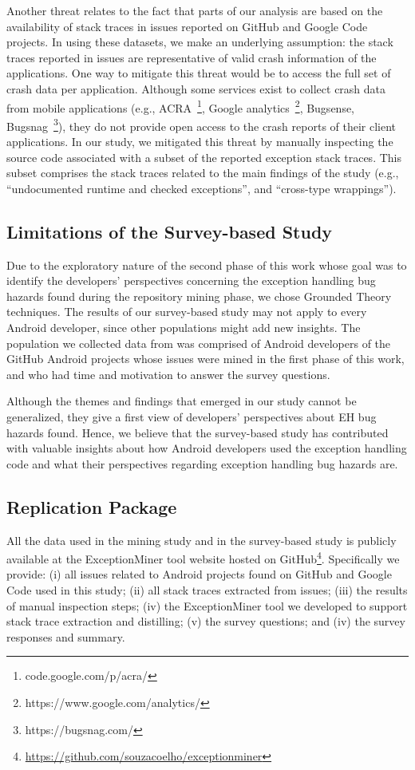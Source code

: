 Another threat relates to the fact that parts of our analysis
are based on the availability of stack traces in issues reported on GitHub and Google Code projects.
In using these datasets, we make an underlying assumption: the stack traces reported in issues are
representative of valid crash information of the applications.
One way to mitigate this threat would be to access the full
set of crash data per application. Although some services exist
to collect crash data from mobile applications (e.g., ACRA~\footnote{code.google.com/p/acra/},  Google analytics~\footnote{https://www.google.com/analytics/}, Bugsense, Bugsnag~\footnote{https://bugsnag.com/}),
they do not provide open access to the crash reports of their client applications.
In our study, we mitigated this threat by manually inspecting
the source code associated with a subset of the reported exception stack traces.
This subset comprises the stack traces related to the main findings
of the study (e.g., ``undocumented runtime and checked exceptions'',
and ``cross-type wrappings'').

\subsection{Limitations of the Survey-based Study}
Due to the exploratory nature of the second phase of this work whose
goal was to identify the developers' perspectives concerning the exception
handling bug hazards found during the repository mining
phase, we chose Grounded Theory techniques. The results of our
survey-based study may not apply to every Android developer, since other populations
might add new insights.  The population we collected data from was comprised
of Android developers of the GitHub
Android projects whose issues were mined in the first phase of this work, and who had
time and motivation to answer the survey questions.

Although the themes and findings that emerged in our study cannot
be generalized, they give a first view of developers' perspectives about
 EH bug hazards found. Hence, we believe that the survey-based study
has contributed with valuable insights about how Android developers
used the exception handling code and what their perspectives regarding
exception handling bug hazards are.

\subsection{Replication Package}
All the data used in the mining study and in the survey-based study is publicly
available at the ExceptionMiner tool website hosted on GitHub\footnote{\url{https://github.com/souzacoelho/exceptionminer}}.
Specifically we provide: (i) all issues related to Android projects found
on GitHub and Google Code used in this study; (ii) all stack traces extracted
from issues; (iii) the results of manual inspection steps; (iv) the
ExceptionMiner tool we developed to support stack trace extraction and distilling;
(v) the survey questions; and (iv) the survey responses and summary.

